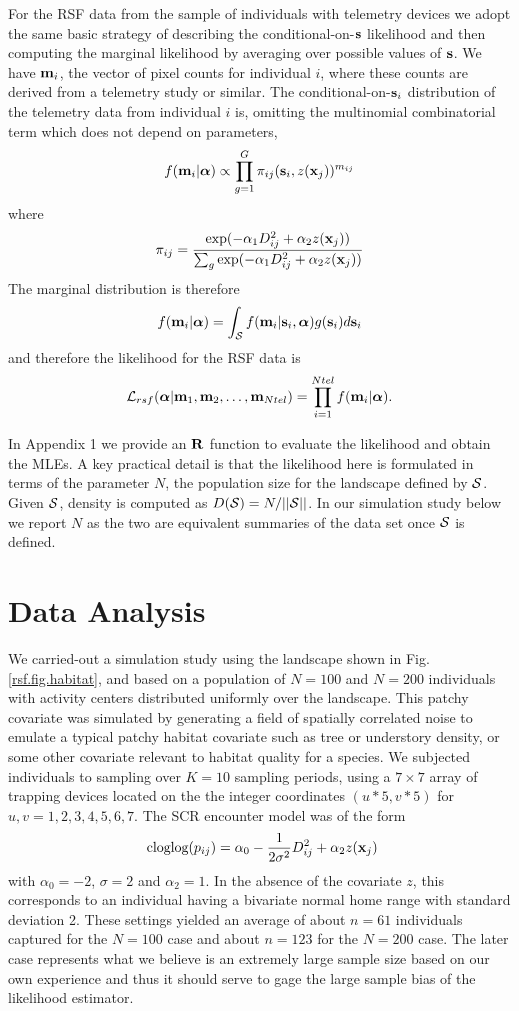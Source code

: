 \documentclass[12pt]{article}
\begin{document}
For the RSF data from the sample of individuals with telemetry devices
we adopt the same basic strategy of describing the
conditional-on-${\bf s}$ likelihood and then computing the marginal
likelihood by averaging over possible values of ${\bf s}$.
We have ${\bf m}_{i}$, the vector of pixel counts for individual $i$,
where these counts are derived from a telemetry study or similar.
The conditional-on-${\bf s}_{i}$ distribution of the telemetry data
from individual $i$ is, omitting the multinomial combinatorial term which does not
depend on parameters,
\[
 f({\bf m}_{i}  | {\bm \alpha} ) \propto
\prod_{g=1}^{G}  \pi_{ij}({\bf s}_{i},z({\bf x}_{j})) ^{m_{ij}}
\]
where
\[
 \pi_{ij}  = \frac{ \exp( -\alpha_{1} D_{ij}^{2} +\alpha_{2} z({\bf x}_{j}) ) }
{ \sum_{g} \exp(-\alpha_{1} D_{ij}^{2} +\alpha_{2} z({\bf x}_{j}))}
\]
The marginal distribution is therefore
\[
f({\bf m}_{i}|{\bm \alpha}) =    \int_{{\cal S}}  f({\bf m}_{i} |{\bf s}_{i},{\bm \alpha}) g({\bf s}_{i}) d{\bf s}_{i}
\]
and therefore the likelihood for the RSF data is
\[
{\cal L}_{rsf}({\bm \alpha} | {\bf m}_{1},{\bf m}_{2},\ldots, {\bf m}_{Ntel}) = \prod_{i=1}^{Ntel}
f({\bf m}_{i}|{\bm \alpha}).
\]

In
 Appendix 1 we provide an ${\bf R}$ function to
evaluate the likelihood and obtain the MLEs.
A key practical detail
is that the likelihood here is formulated in terms of the parameter
$N$, the population size for the landscape defined by ${\cal
  S}$. Given ${\cal S}$, density is computed as $D({\cal S}) =
N/||{\cal S}||$. In our simulation study below we report $N$ as the
two are equivalent summaries of the data set once ${\cal S}$ is
defined.


\section{Data Analysis}


We carried-out a simulation study using the landscape shown in
Fig. \ref{rsf.fig.habitat}, and based on a population of $N=100$ and $N=200$
individuals with activity centers distributed uniformly over the
landscape.  This patchy covariate was simulated by generating a field
of spatially correlated noise to emulate a typical patchy habitat
covariate such as tree or understory density, or some other covariate
relevant to habitat quality for a species.  We subjected individuals
to sampling over $K=10$ sampling periods, using a $7 \times 7$ array
of trapping devices located on the the integer coordinates $(u*5,v*5)$
for $u,v = 1,2,3,4,5,6,7$. The SCR encounter model was of the form
\[
\mbox{ cloglog}(p_{ij}) = \alpha_{0}  -\frac{1}{2\sigma^{2}} D_{ij}^{2} + \alpha_{2}  z({\bf x}_{j})
\]
with $\alpha_{0} = -2$,  $\sigma =2$ and $\alpha_{2} = 1$.
In the absence of the covariate $z$, this corresponds
to an individual having a bivariate normal home range with standard
deviation 2.
These settings yielded an average of about $n=61$ individuals captured for
the $N=100$ case and about $n=123$ for the $N=200$ case. The later case
represents what we believe is an extremely large sample size based on
our own experience and thus it should serve to gage the large sample
bias of the likelihood estimator.
\end{document}
